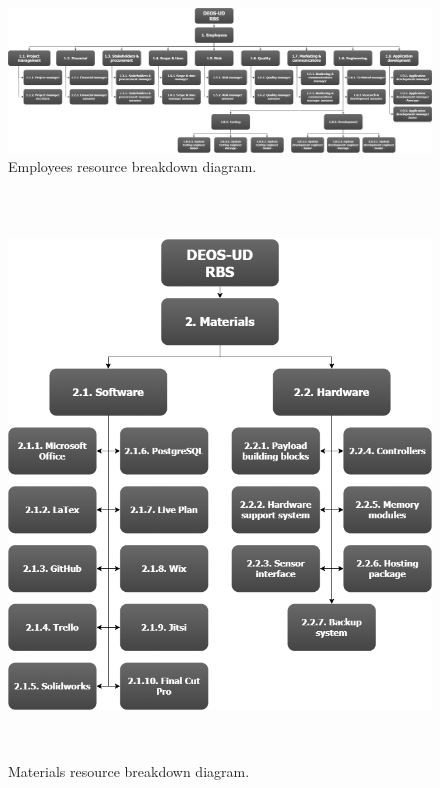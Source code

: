 \begin{landscape}\tiny

\vspace*{\fill}
\begin{figure}[H]
	\centering
	\includegraphics[height=0.52\textheight]{./sections/4.Estimate_activity_resources/RBS_Section1}
	\caption[Employees resource breakdown diagram]{Employees resource breakdown diagram.}
	\label{fig:RBS_Section1}
\end{figure}
\vspace*{\fill}

\end{landscape}

\begin{figure}[H]
	\centering
	\includegraphics[height=15cm,keepaspectratio]{./sections/4.Estimate_activity_resources/RBS_Section2}
	\caption[Materials resource breakdown diagram]{Materials resource breakdown diagram.}
	\label{fig:RBS_Section2}
\end{figure}

